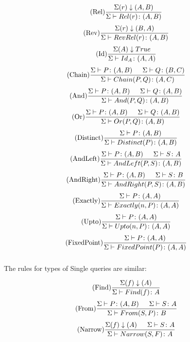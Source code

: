 \documentclass[twoside,a4paper,11pt]{article}
\begin{document}
\[ \begin{array}{c}
\displaystyle\mbox{(Rel)}\frac{\Sigma(r)\downarrow(A, B)}{\Sigma \vdash Rel(r) \colon (A, B)} \\[3ex]
\displaystyle\mbox{(Rev)}\frac{\Sigma(r)\downarrow(B, A)}{\Sigma \vdash RevRel(r) \colon (A, B)} \\[3ex]
\displaystyle\mbox{(Id)}\frac{\Sigma(A)\downarrow True}{\Sigma \vdash Id_A \colon (A, A)} \\[3ex]
\displaystyle\mbox{(Chain)}\frac{\Sigma\vdash P \colon (A, B) \indent \Sigma\vdash Q \colon (B, C)}{\Sigma \vdash Chain(P, Q) \colon (A, C)} \\[3ex]

\displaystyle\mbox{(And)}\frac{\Sigma\vdash P \colon (A, B) \indent \Sigma\vdash Q \colon (A, B)}{\Sigma \vdash And(P, Q) \colon (A, B)} \\[3ex]

\displaystyle\mbox{(Or)}\frac{\Sigma\vdash P \colon (A, B) \indent \Sigma\vdash Q \colon (A, B)}{\Sigma \vdash Or(P, Q) \colon (A, B)} \\[3ex]

\displaystyle\mbox{(Distinct)}\frac{\Sigma\vdash P \colon (A, B)}{\Sigma \vdash Distinct(P) \colon (A, B)} \\[3ex]

\displaystyle\mbox{(AndLeft)}\frac{\Sigma\vdash P \colon (A, B) \indent \Sigma\vdash S \colon A}{\Sigma \vdash AndLeft(P, S) \colon (A, B)} \\[3ex]

\displaystyle\mbox{(AndRight)}\frac{\Sigma\vdash P \colon (A, B) \indent \Sigma\vdash S \colon B}{\Sigma \vdash AndRight(P, S) \colon (A, B)} \\[3ex]

\displaystyle\mbox{(Exactly)}\frac{\Sigma\vdash P \colon (A, A)}{\Sigma \vdash Exactly(n, P) \colon (A, A)} \\[3ex]

\displaystyle\mbox{(Upto)}\frac{\Sigma\vdash P \colon (A, A)}{\Sigma \vdash Upto(n, P) \colon (A, A)} \\[3ex]

\displaystyle\mbox{(FixedPoint)}\frac{\Sigma\vdash P \colon (A, A)}{\Sigma \vdash FixedPoint(P) \colon (A, A)} \\[3ex]

\end{array} \]


The rules for types of Single queries are similar:

\[ \begin{array}{c}
\displaystyle\mbox{(Find)}\frac{\Sigma(f)\downarrow(A)}{\Sigma \vdash Find(f) \colon A} \\[3ex]
\displaystyle\mbox{(From)}\frac{\Sigma\vdash P \colon (A, B) \indent \Sigma\vdash S \colon A}{\Sigma \vdash From(S, P) \colon B} \\[3ex]
\displaystyle\mbox{(Narrow)}\frac{\Sigma(f)\downarrow(A) \indent \Sigma \vdash S \colon A}{\Sigma \vdash Narrow(S, F) \colon A} \\[3ex]
\end{array}
\]
\end{document}

